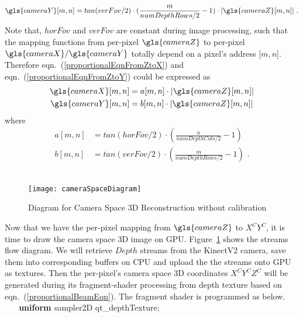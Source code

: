 %
\begin{equation}
\gls{cameraY}[m, n] = tan(verFov / 2) \cdot (\frac{m}{numDepthRows/2} - 1) \cdot |\gls{cameraZ}[m, n]| \  .
\label{proportionalEqnFromZtoY}
\end{equation}%
\noindent
Note that, \(horFov\) and \(verFov\) are constant during image processing, such that the mapping functions from per-pixel \(\gls{cameraZ}\) to per-pixel \(\gls{cameraX}/\gls{cameraY}\) totally depend on a pixel's address [\(m, n\)]. Therefore eqn.~(\ref{proportionalEqnFromZtoX}) and eqn.~(\ref{proportionalEqnFromZtoY}) could be expressed as 
%
\begin{equation}
\begin{aligned}
\gls{cameraX}[m, n] &= a[m, n] \cdot |\gls{cameraZ}[m, n]|
\\%
\gls{cameraY}[m, n] &= b[m, n] \cdot |\gls{cameraZ}[m, n]| 
\end{aligned}
\label{proportionalBeamEqn}
\end{equation}%
\noindent
where
%
\begin{equation}
\begin{aligned}
a[m, n] &= tan(horFov / 2) \cdot (\frac{n}{numDepthCols / 2} - 1)
\\%
b[m, n] &= tan(verFov / 2) \cdot (\frac{m}{numDepthRows / 2} - 1) \, \, .
\end{aligned}
\label{parametersABofProportional}
\end{equation}%
\\\indent
%
\begin{figure}[!t]
\centering
\texttt{[image: cameraSpaceDiagram]}
\caption{Diagram for Camera Space \gls{3D} Reconstruction without calibration}
\label{cameraSpaceDiagram}
\end{figure}%
%
Now that we have the per-pixel mapping from \(\gls{cameraZ}\) to \(X^CY^C\), it is time to draw the camera space \gls{3D} image on \gls{GPU}. Figure~\ref{cameraSpaceDiagram} shows the streams flow diagram. We will retrieve \(Depth\) streams from the \gls{KinectV2} camera, save them into corresponding buffers on CPU and upload the the streams onto \gls{GPU} as textures. Then the per-pixel's camera space \gls{3D} coordinates \(X^CY^CZ^C\) will be generated during its fragment-shader processing from depth texture based on eqn.~(\ref{proportionalBeamEqn}). The fragment shader is programmed as below.
\\%
{\ttfamily
\textbf{\textcolor[rgb]{0.5019608,0.5019608,0.0}{\ \ \ uniform }}\textcolor[rgb]{0.7529412,0.7529412,0.7529412}{
 }\textcolor[rgb]{0.5019608,0.5019608,0.0}{sampler2D }\textcolor[rgb]{0.7529412,0.7529412,0.7529412}{
}qt\_depthTexture;\textcolor[rgb]{0.7529412,0.7529412,0.7529412}{
\ \ }}


